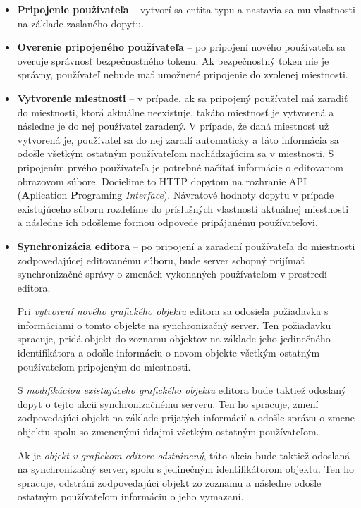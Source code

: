 \begin{itemize}
	\item \textbf{Pripojenie používateľa} -- vytvorí sa entita typu  a nastavia sa mu vlastnosti na základe zaslaného dopytu. 
	
	\item \textbf{Overenie pripojeného používateľa} -- po pripojení nového používateľa sa overuje správnosť bezpečnostného tokenu. Ak bezpečnostný token nie je správny, používateľ nebude mať umožnené pripojenie do zvolenej miestnosti.
	
	\item \textbf{Vytvorenie miestnosti} -- v prípade, ak sa pripojený používateľ má zaradiť do miestnosti, ktorá aktuálne neexistuje, takáto miestnosť je vytvorená a následne je do nej používateľ zaradený. V prípade, že daná miestnosť už vytvorená je, používateľ sa do nej zaradí automaticky a táto informácia sa odošle všetkým ostatným používateľom nachádzajúcim sa v miestnosti. S pripojením prvého používateľa je potrebné načítať informácie o editovanom obrazovom súbore. Docielime to HTTP dopytom na rozhranie API (\textbf{A}plication \textbf{P}rograming \textit{Interface}). Návratové hodnoty dopytu v prípade existujúceho súboru rozdelíme do príslušných vlastností aktuálnej miestnosti a následne ich odošleme formou odpovede pripájanému používateľovi.
	
	\item \textbf{Synchronizácia editora} -- po pripojení a zaradení používateľa do miestnosti zodpovedajúcej editovanému súboru, bude server schopný prijímať synchronizačné správy o zmenách vykonaných používateľom v prostredí editora. 
	
	Pri \textit{vytvorení nového grafického objektu} editora sa odosiela požiadavka s informáciami o tomto objekte na synchronizačný server. Ten požiadavku spracuje, pridá objekt do zoznamu objektov na základe jeho jedinečného identifikátora a odošle informáciu o novom objekte všetkým ostatným používateľom pripojeným do miestnosti.
	
	S \textit{modifikáciou existujúceho grafického objektu} editora bude taktiež odoslaný dopyt o tejto akcii synchronizačnému serveru. Ten ho spracuje, zmení zodpovedajúci objekt na základe prijatých informácií a odošle správu o zmene objektu spolu so zmenenými údajmi všetkým ostatným používateľom.
	
	Ak je \textit{objekt v grafickom editore odstránený}, táto akcia bude taktiež odoslaná na synchronizačný server, spolu s jedinečným identifikátorom objektu. Ten ho spracuje, odstráni zodpovedajúci objekt zo zoznamu a následne odošle ostatným používateľom informáciu o jeho vymazaní.
	

\end{itemize}
